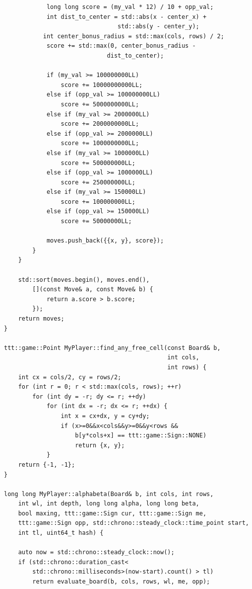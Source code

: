 \documentclass[a4paper,14pt]{extreport}
\begin{document}
\begin{lstlisting}
            long long score = (my_val * 12) / 10 + opp_val; 
            int dist_to_center = std::abs(x - center_x) + 
                                std::abs(y - center_y);
           int center_bonus_radius = std::max(cols, rows) / 2; 
            score += std::max(0, center_bonus_radius - 
                             dist_to_center); 
            
            if (my_val >= 100000000LL) 
                score += 10000000000LL;       
            else if (opp_val >= 100000000LL) 
                score += 5000000000LL;  
            else if (my_val >= 2000000LL) 
                score += 2000000000LL;     
            else if (opp_val >= 2000000LL) 
                score += 1000000000LL;    
            else if (my_val >= 1000000LL) 
                score += 500000000LL;      
            else if (opp_val >= 1000000LL) 
                score += 250000000LL;     
            else if (my_val >= 150000LL) 
                score += 100000000LL;       
            else if (opp_val >= 150000LL) 
                score += 50000000LL;       
            
            moves.push_back({{x, y}, score});
        }
    }
    
    std::sort(moves.begin(), moves.end(), 
        [](const Move& a, const Move& b) { 
            return a.score > b.score; 
        });
    return moves;
}

ttt::game::Point MyPlayer::find_any_free_cell(const Board& b, 
                                              int cols, 
                                              int rows) {
    int cx = cols/2, cy = rows/2;
    for (int r = 0; r < std::max(cols, rows); ++r)
        for (int dy = -r; dy <= r; ++dy)
            for (int dx = -r; dx <= r; ++dx) {
                int x = cx+dx, y = cy+dy;
                if (x>=0&&x<cols&&y>=0&&y<rows && 
                    b[y*cols+x] == ttt::game::Sign::NONE) 
                    return {x, y};
            }
    return {-1, -1};
}

long long MyPlayer::alphabeta(Board& b, int cols, int rows, 
    int wl, int depth, long long alpha, long long beta, 
    bool maxing, ttt::game::Sign cur, ttt::game::Sign me, 
    ttt::game::Sign opp, std::chrono::steady_clock::time_point start, 
    int tl, uint64_t hash) {
    
    auto now = std::chrono::steady_clock::now();
    if (std::chrono::duration_cast<
        std::chrono::milliseconds>(now-start).count() > tl) 
        return evaluate_board(b, cols, rows, wl, me, opp);
    

\end{lstlisting}
\end{document}
